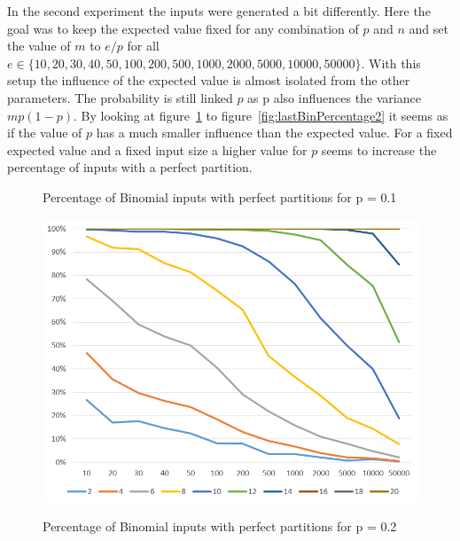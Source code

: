 In the second experiment the inputs were generated a bit differently. Here the goal was to keep the expected value fixed for any combination of $p$ and $n$ and set the value of $m$ to $e/p$ for all $e \in \{10, 20, 30, 40, 50, 100, 200, 500, 1000, 2000, 5000, 10000, 50000\}$. With this setup the influence of the expected value is almost isolated from the other parameters. The probability is still linked $p$ as p also influences the variance $mp(1-p)$. By looking at figure~\ref{fig:firstBinPercentage2} to figure~\ref{fig:lastBinPercentage2} it seems as if the value of $p$ has a much smaller influence than the expected value. For a fixed expected value and a fixed input size a higher value for $p$ seems to increase the percentage of inputs with a perfect partition. 

\begin{figure}[h]
      \centering
      \begin{minipage}[b]{0.45\textwidth}
            \caption{Percentage of Binomial inputs with perfect partitions for p = 0.1}
            \includegraphics[width=\textwidth]{figures/images/solvabilityOfInputs/solvability0_1.png}\label{fig:firstBinPercentage2}
      \end{minipage}
      \hspace{0.75cm}
      \begin{minipage}[b]{0.45\textwidth}
            \caption{Percentage of Binomial inputs with perfect partitions for p = 0.2}

\end{minipage}
\end{figure}

